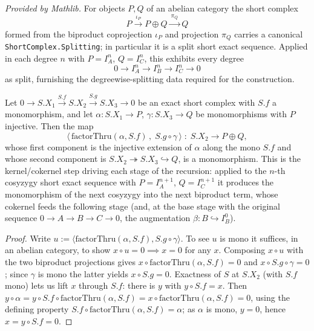 \begin{lemma}
  \label{lem:horseshoe_degree_split}
  \mathlibok
  \textit{Provided by Mathlib.}
  For objects \(P, Q\) of an abelian category the short complex
  \[
    P \xrightarrow{\ \iota_P\ } P \oplus Q \xrightarrow{\ \pi_Q\ } Q
  \]
  formed from the biproduct coprojection \(\iota_P\) and projection \(\pi_Q\) carries a
  canonical \texttt{ShortComplex.Splitting}; in particular it is a split short exact
  sequence. Applied in each degree \(n\) with \(P = I_A^n\), \(Q = I_C^n\), this exhibits
  every degree
  \[
    0 \longrightarrow I_A^n \longrightarrow I_B^n \longrightarrow I_C^n \longrightarrow 0
  \]
  as split, furnishing the degreewise-splitting data required for the construction.
\end{lemma}

\begin{lemma}\leanok
  \label{lem:horseshoe_stage_mono}
  Let \(0 \to S.X_1 \xrightarrow{S.f} S.X_2 \xrightarrow{S.g} S.X_3 \to 0\) be an exact
  short complex with \(S.f\) a monomorphism, and let \(\alpha : S.X_1 \to P\),
  \(\gamma : S.X_3 \to Q\) be monomorphisms with \(P\) injective. Then the map
  \[
    \bigl\langle\, \mathrm{factorThru}(\alpha, S.f)\,,\; S.g \circ \gamma \,\bigr\rangle
      \;:\; S.X_2 \longrightarrow P \oplus Q,
  \]
  whose first component is the injective extension of \(\alpha\) along the mono \(S.f\)
  and whose second component is \(S.X_2 \twoheadrightarrow S.X_3 \hookrightarrow Q\), is a
  monomorphism. This is the kernel/cokernel step driving each stage of the recursion:
  applied to the \(n\)-th cosyzygy short exact sequence with \(P = I_A^{n+1}\),
  \(Q = I_C^{n+1}\) it produces the monomorphism of the next cosyzygy into the next
  biproduct term, whose cokernel feeds the following stage (and, at the base stage with
  the original sequence \(0 \to A \to B \to C \to 0\), the augmentation
  \(\beta : B \hookrightarrow I_B^0\)).
\end{lemma}

\begin{proof}
  \leanok
  Write \(u := \langle \mathrm{factorThru}(\alpha, S.f), S.g \circ \gamma\rangle\). To see
  \(u\) is mono it suffices, in an abelian category, to show \(x \circ u = 0 \implies x = 0\)
  for any \(x\). Composing \(x \circ u\) with the two biproduct projections gives
  \(x \circ \mathrm{factorThru}(\alpha, S.f) = 0\) and \(x \circ S.g \circ \gamma = 0\);
  since \(\gamma\) is mono the latter yields \(x \circ S.g = 0\). Exactness of \(S\) at
  \(S.X_2\) (with \(S.f\) mono) lets us lift \(x\) through \(S.f\): there is \(y\) with
  \(y \circ S.f = x\). Then \(y \circ \alpha = y \circ S.f \circ \mathrm{factorThru}(\alpha, S.f)
  = x \circ \mathrm{factorThru}(\alpha, S.f) = 0\), using the defining property
  \(S.f \circ \mathrm{factorThru}(\alpha, S.f) = \alpha\); as \(\alpha\) is mono, \(y = 0\),
  hence \(x = y \circ S.f = 0\).
\end{proof}


